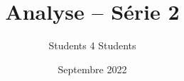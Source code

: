 \documentclass[11.5pt,french,table]{article}
\title{Analyse -- Série 2}
\author{Students 4 Students}
\date{Septembre 2022}
\theoremstyle{exercice}
\begin{document}
\maketitle

{
\let\clearpage\relax %



}
\end{document}
